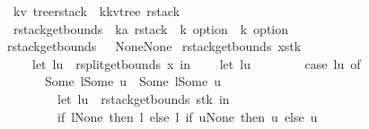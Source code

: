 \begin{isabellebody}
\isanewline
\isanewline
\isanewline
\isanewline
\isanewline
{}\isamarkupfalse%
\ {\isacharparenleft}{\isacharprime}k{\isacharcomma}{\isacharprime}v{\isacharparenright}\ tree{\isacharunderscore}rstack\ {\isacharequal}\ {\isachardoublequoteopen}{\isacharparenleft}{\isacharprime}k{\isacharcomma}{\isacharparenleft}{\isacharprime}k{\isacharcomma}{\isacharprime}v{\isacharparenright}tree{\isacharparenright}\ rstack{\isachardoublequoteclose}\isanewline
\isanewline
\isanewline
\isanewline
\isanewline
\isanewline
\isanewline
\isanewline
\isanewline
{}\isamarkupfalse%
\ rstack{\isacharunderscore}get{\isacharunderscore}bounds\ {\isacharcolon}{\isacharcolon}\ {\isachardoublequoteopen}{\isacharparenleft}{\isacharprime}k{\isacharcomma}{\isacharprime}a{\isacharparenright}\ rstack\ {\isasymRightarrow}\ {\isacharprime}k\ option\ {\isacharasterisk}\ {\isacharprime}k\ option{\isachardoublequoteclose}\ \isanewline
{\isachardoublequoteopen}rstack{\isacharunderscore}get{\isacharunderscore}bounds\ {\isacharbrackleft}{\isacharbrackright}\ {\isacharequal}\ {\isacharparenleft}None{\isacharcomma}None{\isacharparenright}{\isachardoublequoteclose}\isanewline
{\isacharbar}\ {\isachardoublequoteopen}rstack{\isacharunderscore}get{\isacharunderscore}bounds\ {\isacharparenleft}x{\isacharhash}stk{\isacharprime}{\isacharparenright}\ {\isacharequal}\ {\isacharparenleft}\isanewline
\ \ \ \ let\ {\isacharparenleft}l{\isacharprime}{\isacharcomma}u{\isacharprime}{\isacharparenright}\ {\isacharequal}\ rsplit{\isacharunderscore}get{\isacharunderscore}bounds\ x\ in\isanewline
\ \ \ \ let\ {\isacharparenleft}l{\isacharcomma}u{\isacharparenright}\ {\isacharequal}\ {\isacharparenleft}\isanewline
\ \ \ \ \ \ case\ {\isacharparenleft}l{\isacharprime}{\isacharcomma}u{\isacharprime}{\isacharparenright}\ of\isanewline
\ \ \ \ \ \ {\isacharparenleft}Some\ l{\isacharcomma}Some\ u{\isacharparenright}\ {\isasymRightarrow}\ {\isacharparenleft}Some\ l{\isacharcomma}Some\ u{\isacharparenright}\isanewline
\ \ \ \ \ \ {\isacharbar}\ {\isacharunderscore}\ {\isasymRightarrow}\ {\isacharparenleft}\isanewline
\ \ \ \ \ \ \ \ let\ {\isacharparenleft}l{\isacharcomma}u{\isacharparenright}\ {\isacharequal}\ rstack{\isacharunderscore}get{\isacharunderscore}bounds\ stk{\isacharprime}\ in\isanewline
\ \ \ \ \ \ \ \ {\isacharparenleft}{\isacharparenleft}if\ l{\isacharprime}{\isacharequal}None\ then\ l\ else\ l{\isacharprime}{\isacharparenright}{\isacharcomma}\ if\ u{\isacharprime}{\isacharequal}None\ then\ u\ else\ u{\isacharprime}{\isacharparenright}{\isacharparenright}{\isacharparenright}\isanewline

\end{isabellebody}
